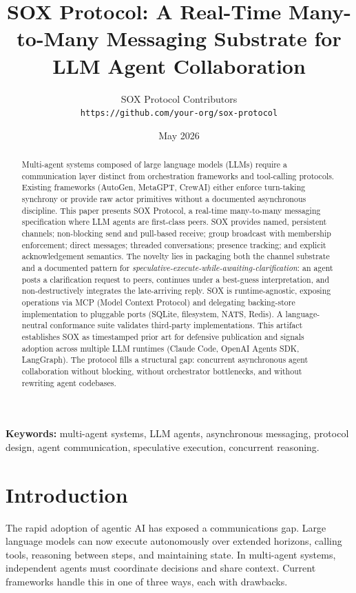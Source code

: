 \documentclass[11pt]{article}
\title{SOX Protocol: A Real-Time Many-to-Many Messaging Substrate for LLM Agent Collaboration}
\author{
  SOX Protocol Contributors \\
  \texttt{https://github.com/your-org/sox-protocol}
}
\date{May 2026}
\begin{document}
\maketitle

\begin{abstract}
  Multi-agent systems composed of large language models (LLMs) require a communication layer distinct from orchestration frameworks and tool-calling protocols. Existing frameworks (AutoGen, MetaGPT, CrewAI) either enforce turn-taking synchrony or provide raw actor primitives without a documented asynchronous discipline. This paper presents SOX Protocol, a real-time many-to-many messaging specification where LLM agents are first-class peers. SOX provides named, persistent channels; non-blocking send and pull-based receive; group broadcast with membership enforcement; direct messages; threaded conversations; presence tracking; and explicit acknowledgement semantics. The novelty lies in packaging both the channel substrate and a documented pattern for \emph{speculative-execute-while-awaiting-clarification}: an agent posts a clarification request to peers, continues under a best-guess interpretation, and non-destructively integrates the late-arriving reply. SOX is runtime-agnostic, exposing operations via MCP (Model Context Protocol) and delegating backing-store implementation to pluggable ports (SQLite, filesystem, NATS, Redis). A language-neutral conformance suite validates third-party implementations. This artifact establishes SOX as timestamped prior art for defensive publication and signals adoption across multiple LLM runtimes (Claude Code, OpenAI Agents SDK, LangGraph). The protocol fills a structural gap: concurrent asynchronous agent collaboration without blocking, without orchestrator bottlenecks, and without rewriting agent codebases.
\end{abstract}

\noindent\textbf{Keywords:} multi-agent systems, LLM agents, asynchronous messaging, protocol design, agent communication, speculative execution, concurrent reasoning.

\section{Introduction}

The rapid adoption of agentic AI has exposed a communications gap. Large language models can now execute autonomously over extended horizons, calling tools, reasoning between steps, and maintaining state. In multi-agent systems, independent agents must coordinate decisions and share context. Current frameworks handle this in one of three ways, each with drawbacks.
\end{document}
